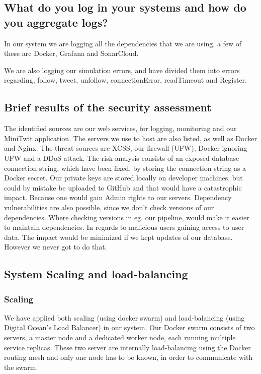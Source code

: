 \subsection{What do you log in your systems and how do you aggregate logs?}
In our system we are logging all the dependencies that we are using, a few of these are Docker, Grafana and SonarCloud. 

We are also logging our simulation errors, and have divided them into errors regarding, follow, tweet, unfollow, connectionError, readTimeout and Register.


\subsection{Brief results of the security assessment}
The identified sources are our web services, for logging, monitoring and our MiniTwit application.
The servers we use to host are also listed, as well as Docker and Nginx.
The threat sources are XCSS, our firewall (UFW), Docker ignoring UFW and a DDoS attack.
The risk analysis consists of an exposed database connection string, which have been fixed, by storing the connection string as a Docker secret. Our private keys are stored locally on developer machines, but could by mistake be uploaded to GitHub and that would have a catastrophic impact. Because one would gain Admin rights to our servers.
Dependency vulnerabilities are also possible, since we don't check versions of our dependencies. Where checking versions in eg. our pipeline, would make it easier to maintain dependencies.
In regards to malicious users gaining access to user data. The impact would be minimized if we kept updates of our database. However we never got to do that.

\subsection{System Scaling and load-balancing}
\subsubsection{Scaling}
We have applied both scaling (using docker swarm) and load-balancing (using Digital Ocean's Load Balancer) in our system. 
Our Docker swarm consists of two servers, a master node and a dedicated worker node, each running multiple service replicas. 
These two server are internally load-balancing using the Docker routing mesh and only one node has to be known, in order to communicate with the swarm.

